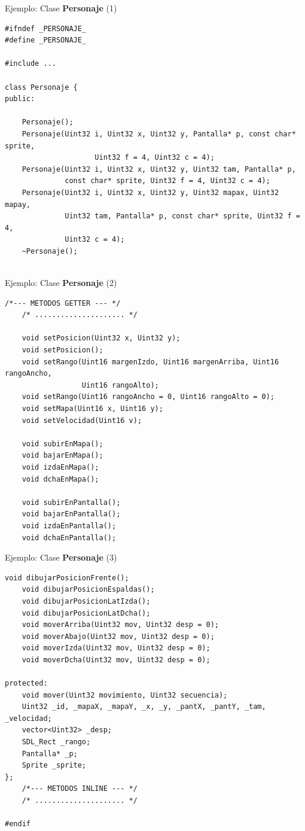 \documentclass[9pt,xcolor=svgnames]{beamer}
\begin{document}
  \begin{frame}[fragile=singleslide]{Ejemplo: Clase \textbf{Personaje} (1)}
   \transdissolve
   
   \begin{lstlisting}[style=C++]
#ifndef _PERSONAJE_
#define _PERSONAJE_

#include ...

class Personaje {
public:

    Personaje();
    Personaje(Uint32 i, Uint32 x, Uint32 y, Pantalla* p, const char* sprite,
                     Uint32 f = 4, Uint32 c = 4);               
    Personaje(Uint32 i, Uint32 x, Uint32 y, Uint32 tam, Pantalla* p,
              const char* sprite, Uint32 f = 4, Uint32 c = 4);       
    Personaje(Uint32 i, Uint32 x, Uint32 y, Uint32 mapax, Uint32 mapay,
              Uint32 tam, Pantalla* p, const char* sprite, Uint32 f = 4,
              Uint32 c = 4);
    ~Personaje();


   \end{lstlisting}
  \end{frame}
  
  \begin{frame}[fragile=singleslide]{Ejemplo: Clase \textbf{Personaje} (2)}
   \transdissolve
   
   \begin{lstlisting}[style=C++]
    /*--- METODOS GETTER --- */
    /* ..................... */

    void setPosicion(Uint32 x, Uint32 y);
    void setPosicion();
    void setRango(Uint16 margenIzdo, Uint16 margenArriba, Uint16 rangoAncho,
                  Uint16 rangoAlto);
    void setRango(Uint16 rangoAncho = 0, Uint16 rangoAlto = 0);
    void setMapa(Uint16 x, Uint16 y);
    void setVelocidad(Uint16 v);

    void subirEnMapa();
    void bajarEnMapa();
    void izdaEnMapa();
    void dchaEnMapa();

    void subirEnPantalla();
    void bajarEnPantalla();
    void izdaEnPantalla();
    void dchaEnPantalla();
   \end{lstlisting}
  \end{frame}

  \begin{frame}[fragile=singleslide]{Ejemplo: Clase \textbf{Personaje} (3)}
   \transdissolve
   
   \begin{lstlisting}[style=C++]
    void dibujarPosicionFrente();
    void dibujarPosicionEspaldas();
    void dibujarPosicionLatIzda();
    void dibujarPosicionLatDcha();    
    void moverArriba(Uint32 mov, Uint32 desp = 0);
    void moverAbajo(Uint32 mov, Uint32 desp = 0);
    void moverIzda(Uint32 mov, Uint32 desp = 0);
    void moverDcha(Uint32 mov, Uint32 desp = 0);

protected:
    void mover(Uint32 movimiento, Uint32 secuencia);
    Uint32 _id, _mapaX, _mapaY, _x, _y, _pantX, _pantY, _tam, _velocidad;
    vector<Uint32> _desp;
    SDL_Rect _rango;
    Pantalla* _p;
    Sprite _sprite;
};
    /*--- METODOS INLINE --- */
    /* ..................... */

#endif
   \end{lstlisting}
  \end{frame}
    
\end{document}
